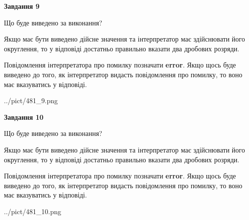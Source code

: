 \documentclass[12pt, ukrainian]{article}
\begin{document}
{\begin {Large}
{\begin {center}\textbf{Завдання 9}\end {center}}\par
Що буде виведено за виконання? \par

Якщо має бути виведено дійсне значення та інтерпретатор має здійснювати його округлення, 
то у відповіді достатньо правильно вказати два дробових розряди.

Повідомлення інтерпретатора про помилку позначати \textbf{error}.
Якщо щось буде виведено до того, як інтерпретатор видасть повідомлення про помилку, 
то воно має вказуватись у відповіді. \par

\begin{center}
	{../pict/481_9.png}
\end{center}
\newpage

{\begin {center}\textbf{Завдання 10}\end {center}}\par
Що буде виведено за виконання? \par

Якщо має бути виведено дійсне значення та інтерпретатор має здійснювати його округлення, 
то у відповіді достатньо правильно вказати два дробових розряди.

Повідомлення інтерпретатора про помилку позначати \textbf{error}.
Якщо щось буде виведено до того, як інтерпретатор видасть повідомлення про помилку, 
то воно має вказуватись у відповіді. \par

\begin{center}
	{../pict/481_10.png}
\end{center}
\newpage

\end {Large}}
\end{document}

